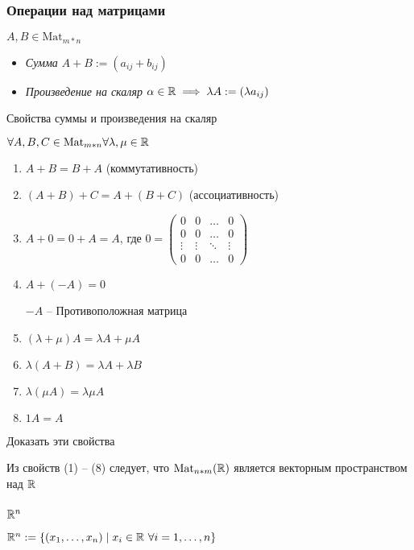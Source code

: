 \subsubsection{Операции над матрицами}

\( A, B \in \text{Mat}_{m*n} \)

\begin{itemize}
	\item \emph{Сумма} \( A + B := (a_{ij} + b_{ij}) \)
	\item \emph{Произведение на скаляр} \( \alpha \in \mathbb{R} \implies \lambda A := (\lambda a_{ij})\)
\end{itemize}

Свойства суммы и произведения на скаляр

\( \forall A, B, C  \in \text{Mat}_{m*n} \forall \lambda, \mu \in \mathbb{R} \)
\begin{enumerate}[label=(\arabic*), nosep]
	\item \( A + B = B + A \) (коммутативность)
	\item \( (A + B) + C = A + (B + C)\) (ассоциативность)
	\item \( A + 0 = 0 + A = A\), где \( 0 = \begin{pmatrix}
		0 & 0 & \dots & 0 \\
		0 & 0 & \dots & 0 \\
		\vdots & \vdots & \ddots & \vdots \\

		0 & 0 & \dots & 0
	\end{pmatrix} \)
	\item \( A + (-A) = 0 \)
	
	\( -A \) -- Противоположная матрица
	\item \( (\lambda + \mu) A = \lambda A + \mu A \)
	\item \( \lambda (A + B) = \lambda A + \lambda B \)
	\item \( \lambda (\mu A) = \lambda \mu A \)
	\item \( 1 A = A \)
\end{enumerate}

\begin{exercise}
	Доказать эти свойства
\end{exercise}

\begin{remark}
	Из свойств (1) -- (8) следует, что \( \text{Mat}_{n*m}(\mathbb{R}) \) является векторным пространством над \( \mathbb{R} \)
\end{remark}

\subsubsection{\(\mathbb{R}^n\)}
\( \mathbb{R}^n := \{ (x_1, \dots, x_n) \mid x_i \in \mathbb{R} \ \forall i = 1, \dots, n \} \)


